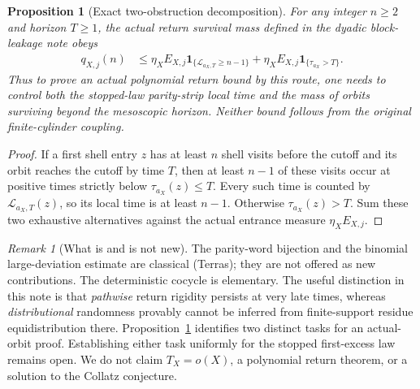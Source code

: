 \documentclass[11pt,a4paper]{article}
\newtheorem{proposition}[theorem]{Proposition}
\theoremstyle{remark}
\newtheorem{remark}[theorem]{Remark}
\newcommand{\ind}{\mathbf 1}
\begin{document}
\begin{proposition}[Exact two-obstruction decomposition]
\label{prop:two-obstructions}
For any integer $n\ge2$ and horizon $T\ge1$, the actual return
survival mass defined in the dyadic block-leakage note obeys
\begin{align}\label{eq:two-obstructions}
 q_{X,j}(n)
 &\le
 \eta_X E_{X,j}\ind_{\{\mathcal L_{a_X,T}\ge n-1\}}
 +\eta_X E_{X,j}\ind_{\{\tau_{a_X}>T\}}.
\end{align}
Thus to prove an actual polynomial return bound by this route,
one needs to control \emph{both} the stopped-law parity-strip local
time and the mass of orbits surviving beyond the mesoscopic horizon.
Neither bound follows from the original finite-cylinder coupling.
\end{proposition}
\begin{proof}
If a first shell entry $z$ has at least $n$ shell visits before the
cutoff and its orbit reaches the cutoff by time $T$, then at least
$n-1$ of these visits occur at positive times strictly below
$\tau_{a_X}(z)\le T$.  Every such time is counted by
$\mathcal L_{a_X,T}(z)$, so its local time is at least $n-1$.
Otherwise $\tau_{a_X}(z)>T$.  Sum these two exhaustive alternatives
against the actual entrance measure $\eta_X E_{X,j}$.
\end{proof}

\begin{remark}[What is and is not new]
The parity-word bijection and the binomial large-deviation estimate
are classical (Terras); they are not offered as new contributions.
The deterministic cocycle is elementary.  The useful distinction in
this note is that \emph{pathwise} return rigidity persists at very
late times, whereas \emph{distributional} randomness provably cannot
be inferred from finite-support residue equidistribution there.
Proposition~\ref{prop:two-obstructions} identifies two distinct tasks
for an actual-orbit proof.  Establishing either task uniformly for
the stopped first-excess law remains open.  We do not claim
$T_X=o(X)$, a polynomial return theorem, or a solution to the
Collatz conjecture.
\end{remark}
\end{document}
